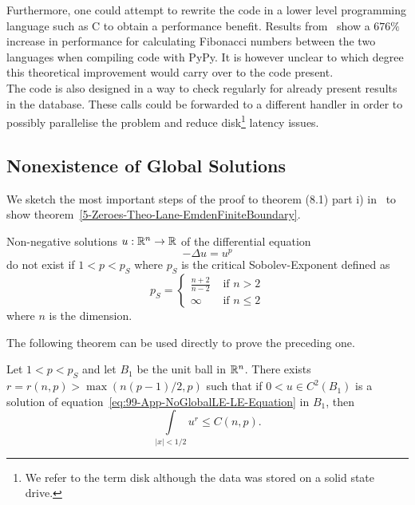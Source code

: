 Furthermore, one could attempt to rewrite the code in a lower level programming language such as C to obtain a performance benefit.
Results from~\cite{jensenDrujensenFib2021} show a $676\%$ increase in performance for calculating Fibonacci numbers between the two languages when compiling code with PyPy.
It is however unclear to which degree this theoretical improvement would carry over to the code present.\\
The code is also designed in a way to check regularly for already present results in the database.
These calls could be forwarded to a different handler in order to possibly parallelise the problem and reduce disk\footnote{We refer to the term disk although the data was stored on a solid state drive.} latency issues.
%
%
%
\subsection{Nonexistence of Global \texorpdfstring{}{LE} Solutions}
\label{subsec:99-App-NoGlobalLE}
We sketch the most important steps of the proof to theorem (8.1) part i) in~\cite[p.~36]{quittnerSuperlinearParabolicProblems2007} to show theorem~\ref{5-Zeroes-Theo-Lane-EmdenFiniteBoundary}.
\begin{lemma}
	\label{lem:99-App-NoGlobalLE-Lemm8-1}
	Non-negative solutions $u:\mathbb{R}^n\rightarrow\mathbb{R}$ of the differential equation
	\begin{equation}
		-\Delta u=u^p
		\label{eq:99-App-NoGlobalLE-LE-Equation}
	\end{equation}
	do not exist if $1<p<p_S$ where $p_S$ is the critical Sobolev-Exponent defined as
	\begin{equation}
		p_S=\begin{cases}
				\frac{n+2}{n-2} &\text{ if } n>2\\
				\infty &\text{ if } n\leq2
			\end{cases}
		\label{eq:99-App-NoGlobalLE-LE-Sobolev-Exponent}
	\end{equation}
	where $n$ is the dimension.
\end{lemma}
The following theorem can be used directly to prove the preceding one.
\begin{lemma}
	\label{lem:99-App-NoGlobalLE-Lemm8-6}
	Let $1<p<p_S$ and let $B_1$ be the unit ball in $\mathbb{R}^n$.
	There exists $r=r(n,p)>\max{(n(p-1)/2,p)}$ such that if $0<u\in C^2(B_1)$ is a solution of equation~\eqref{eq:99-App-NoGlobalLE-LE-Equation} in $B_1$, then
	\begin{equation}
		\int\limits_{|x|<1/2}u^r\leq C(n,p).
		\label{eq:99-App-NoGlobalLE-LE-Inequality}
	\end{equation}
\end{lemma}
